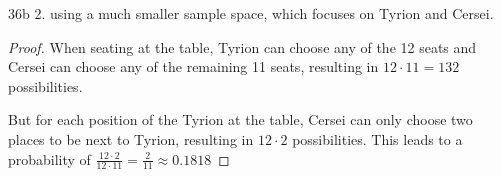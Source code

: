\begin{exercise}{36b}
2. using a much smaller sample space, which focuses on Tyrion and Cersei.
\end{exercise}

\begin{proof}
    When seating at the table, Tyrion can choose any of the 12 seats and Cersei can choose any of the remaining 11 seats, resulting in $12 \cdot 11 = 132$ possibilities.

    But for each position of the Tyrion at the table, Cersei can only choose two places to be next to Tyrion, resulting in $12 \cdot 2$ possibilities. This leads to a probability of $\frac{12\cdot 2}{12 \cdot 11} = \frac{2}{11} \approx 0.1818$
\end{proof}

\newpage
